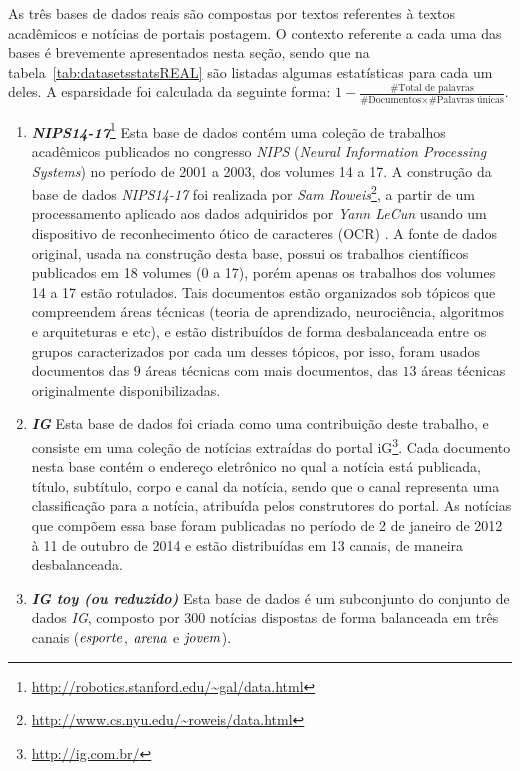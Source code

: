 \documentclass[
    12pt,                %
    oneside,            %
    a4paper,            %
    english,            %
    brazil                %
    ]{abntex2ppgsi}
\begin{document}
As três bases de dados reais são compostas por textos referentes à textos acadêmicos e notícias de portais postagem.
O contexto referente a cada uma das bases é brevemente apresentados nesta seção, sendo que na tabela~\ref{tab:datasetsstatsREAL} são listadas algumas estatísticas para cada um deles.
A esparsidade foi calculada da seguinte forma: $1 - \frac{ \text{\# Total de palavras} }{ \text{\# Documentos} \times \text{\# Palavras únicas} }$.

\begin{enumerate}
    \item \textbf{\textit{NIPS14-17}}\footnote{\url{http://robotics.stanford.edu/~gal/data.html}} Esta base de dados contém uma coleção de trabalhos acadêmicos publicados no congresso \textit{NIPS} (\textit{Neural Information Processing Systems}) no período de 2001 a 2003, dos volumes 14 a 17.
    A construção da base de dados \textit{NIPS14-17} foi realizada por \textit{Sam Roweis}\footnote{\url{http://www.cs.nyu.edu/~roweis/data.html}}, a partir de um processamento aplicado aos dados adquiridos por \textit{Yann LeCun} usando um dispositivo de reconhecimento ótico de caracteres (OCR) \cite{Chechik2007}. A fonte de dados original, usada na construção desta base, possui os trabalhos científicos publicados em 18 volumes (0 a 17), porém apenas os trabalhos dos volumes 14 a 17 estão rotulados. Tais documentos estão organizados sob tópicos que compreendem áreas técnicas (teoria de aprendizado, neurociência, algoritmos e arquiteturas e etc), e estão distribuídos de forma desbalanceada entre os grupos caracterizados por cada um desses tópicos, por isso, foram usados documentos das $9$ áreas técnicas com mais documentos, das $13$ áreas técnicas originalmente disponibilizadas.
    \item \textbf{\textit{IG}} Esta base de dados foi criada como uma contribuição deste trabalho, e consiste em uma coleção de notícias extraídas do portal iG\footnote{\url{http://ig.com.br/}}.
    Cada documento nesta base contém o endereço eletrônico no qual a notícia está publicada, título, subtítulo, corpo e canal da notícia, sendo que o canal representa uma classificação para a notícia, atribuída pelos construtores do portal. As notícias que compõem essa base foram publicadas no período de 2 de janeiro de 2012 à 11 de outubro de 2014 e estão distribuídas em 13 canais, de maneira desbalanceada.
    \item \textbf{\textit{IG toy (ou reduzido)}} Esta base de dados é um subconjunto do conjunto de dados \textit{IG}, composto por $300$ notícias dispostas de forma balanceada em três canais ($\text{\textit{esporte}}$, $\text{\textit{arena}}$ e $\text{\textit{jovem}}$).
\end{enumerate}
\end{document}
